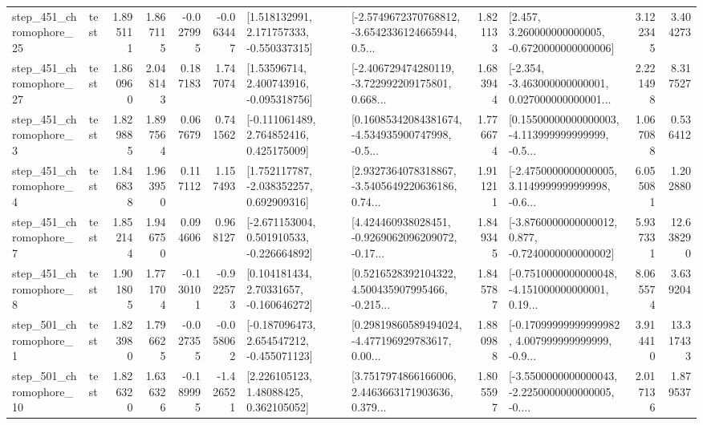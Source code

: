 \begin{tabular}{llrrrrllrlrr}
  step\_451\_chromophore\_25 &      test &      1.895111 &    1.867115 &     -0.027995 & -0.063447 &    [1.518132991, 2.171757333, -0.550337315] &  [-2.5749672370768812, -3.6542336124665944, 0.5... &       1.821133 &    [2.457, 3.260000000000005, -0.6720000000000006] &            3.122345 &          3.404273 \\
  step\_451\_chromophore\_27 &      test &      1.860960 &    2.048143 &      0.187183 &  1.747074 &     [1.53596714, 2.400743916, -0.095318756] &  [-2.406729474280119, -3.722992209175801, 0.668... &       1.683944 &  [-2.354, -3.463000000000001, 0.027000000000001... &            2.221498 &          8.317527 \\
   step\_451\_chromophore\_3 &      test &      1.829885 &    1.897564 &      0.067679 &  0.741562 &    [-0.111061489, 2.764852416, 0.425175009] &  [0.16085342084381674, -4.534935900747998, -0.5... &       1.776674 &  [0.15500000000000003, -4.113999999999999, -0.5... &            1.067088 &          0.536412 \\
   step\_451\_chromophore\_4 &      test &      1.846838 &    1.963950 &      0.117112 &  1.157493 &    [1.752117787, -2.038352257, 0.692909316] &  [2.9327364078318867, -3.5405649220636186, 0.74... &       1.911211 &  [-2.4750000000000005, 3.1149999999999998, -0.6... &            6.055081 &          1.202880 \\
   step\_451\_chromophore\_7 &      test &      1.852144 &    1.946750 &      0.094606 &  0.968127 &   [-2.671153004, 0.501910533, -0.226664892] &  [4.424460938028451, -0.9269062096209072, -0.17... &       1.849345 &  [-3.8760000000000012, 0.877, -0.7240000000000002] &            5.937331 &         12.638290 \\
   step\_451\_chromophore\_8 &      test &      1.901805 &    1.771704 &     -0.130101 & -0.922573 &     [0.104181434, 2.70331657, -0.160646272] &  [0.5216528392104322, 4.500435907995466, -0.215... &       1.845787 &  [-0.7510000000000048, -4.151000000000001, 0.19... &            8.065574 &          3.639204 \\
   step\_501\_chromophore\_1 &      test &      1.823980 &    1.796625 &     -0.027355 & -0.058062 &   [-0.187096473, 2.654547212, -0.455071123] &  [0.29819860589494024, -4.477196929783617, 0.00... &       1.880988 &  [-0.17099999999999982, 4.007999999999999, -0.9... &            3.914410 &         13.317433 \\
  step\_501\_chromophore\_10 &      test &      1.826320 &    1.636326 &     -0.189995 & -1.426521 &      [2.226105123, 1.48088425, 0.362105052] &  [3.7517974866166006, 2.4463663171903636, 0.379... &       1.805597 &  [-3.5500000000000043, -2.2250000000000005, -0.... &            2.017136 &          1.879537 \\

\end{tabular}
